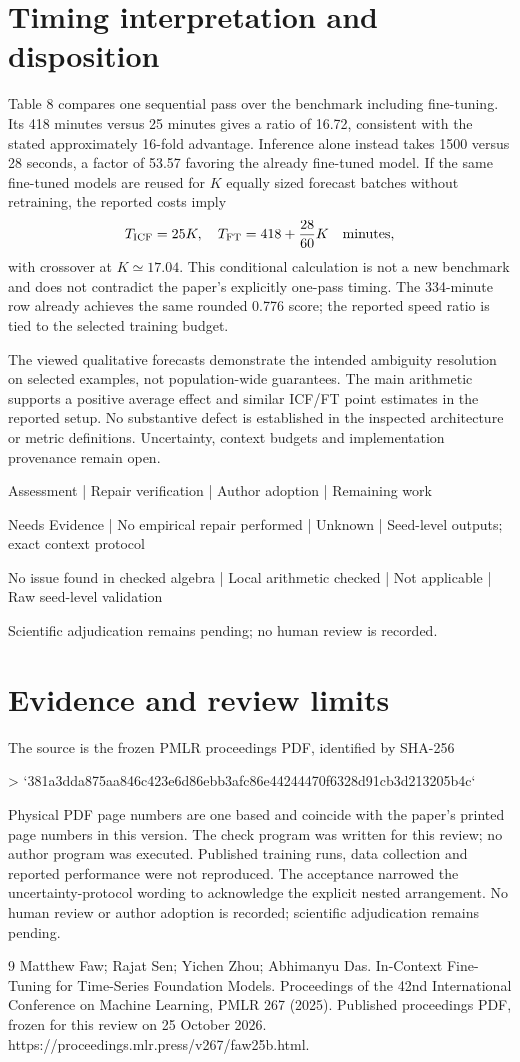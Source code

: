 \documentclass[10pt]{article}
\begin{document}
\section*{Timing interpretation and disposition}
Table 8 compares one sequential pass over the benchmark including fine-tuning. Its 418 minutes versus 25 minutes gives a ratio of 16.72, consistent with the stated approximately 16-fold advantage. Inference alone instead takes 1500 versus 28 seconds, a factor of 53.57 favoring the already fine-tuned model. If the same fine-tuned models are reused for \(K\) equally sized forecast batches without retraining, the reported costs imply \[T_{\rm ICF}=25K,\quad T_{\rm FT}=418+\frac{28}{60}K
 \quad\hbox{minutes},\] with crossover at \(K\simeq17.04\). This conditional calculation is not a new benchmark and does not contradict the paper’s explicitly one-pass timing. The 334-minute row already achieves the same rounded 0.776 score; the reported speed ratio is tied to the selected training budget.\par
The viewed qualitative forecasts demonstrate the intended ambiguity resolution on selected examples, not population-wide guarantees. The main arithmetic supports a positive average effect and similar ICF/FT point estimates in the reported setup. No substantive defect is established in the inspected architecture or metric definitions. Uncertainty, context budgets and implementation provenance remain open.\par
Assessment | Repair verification | Author adoption | Remaining work\par
Needs Evidence | No empirical repair performed | Unknown | Seed-level outputs; exact context protocol\par
No issue found in checked algebra | Local arithmetic checked | Not applicable | Raw seed-level validation\par
Scientific adjudication remains pending; no human review is recorded.\par
\section*{Evidence and review limits}
The source is the frozen PMLR proceedings PDF, identified by SHA-256\par
> `381a3dda875aa846c423e6d86ebb3afc86e44244470f6328d91cb3d213205b4c`\par
Physical PDF page numbers are one based and coincide with the paper’s printed page numbers in this version. The check program was written for this review; no author program was executed. Published training runs, data collection and reported performance were not reproduced. The acceptance narrowed the uncertainty-protocol wording to acknowledge the explicit nested arrangement. No human review or author adoption is recorded; scientific adjudication remains pending.\par
9 Matthew Faw; Rajat Sen; Yichen Zhou; Abhimanyu Das. In-Context Fine-Tuning for Time-Series Foundation Models. Proceedings of the 42nd International Conference on Machine Learning, PMLR 267 (2025). Published proceedings PDF, frozen for this review on 25 October 2026. https://proceedings.mlr.press/v267/faw25b.html.\par
\end{document}
